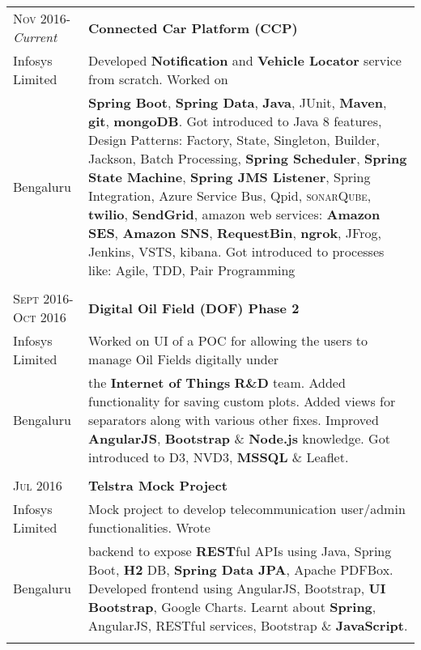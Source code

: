\documentclass[a4paper,10pt]{article} %
\begin{document}
\begin{tabular}{l|p{11cm}}
\textsc{Nov 2016-}\emph{Current} & \textbf{Connected Car Platform (CCP)} \\
Infosys Limited & \footnotesize{Developed \textbf{Notification} and \textbf{Vehicle Locator} service from scratch. Worked on}\\ 
Bengaluru & \footnotesize{\textbf{Spring Boot}, \textbf{Spring Data}, \textbf{Java}, JUnit, \textbf{Maven}, \textbf{git}, \textbf{mongoDB}. Got introduced to Java 8 features, Design Patterns: Factory, State, Singleton, Builder, Jackson, Batch Processing, \textbf{Spring Scheduler}, \textbf{Spring State Machine}, \textbf{Spring JMS Listener}, Spring Integration, Azure Service Bus, Qpid, \textsc{sonar}Q\textsc{ube}, \textbf{twilio}, \textbf{SendGrid}, amazon web services: \textbf{Amazon SES}, \textbf{Amazon SNS}, \textbf{RequestBin}, \textbf{ngrok}, JFrog, Jenkins, VSTS,  kibana. Got introduced to processes like: Agile, TDD, Pair Programming}\\
\multicolumn{2}{c}{} \\


\textsc{Sept 2016-Oct 2016} & \textbf{Digital Oil Field (DOF) Phase 2}\emph{}\\
Infosys Limited & \footnotesize{Worked on UI of a POC for allowing the users to manage Oil Fields digitally under}\\
Bengaluru & \footnotesize{the \textbf{Internet of Things} \textbf{R\&D} team. Added functionality for saving custom plots. Added views for separators along with various other fixes. Improved \textbf{AngularJS}, \textbf{Bootstrap} \& \textbf{Node.js} knowledge. Got introduced to D3, NVD3, \textbf{MSSQL} \& Leaflet.}\\
\multicolumn{2}{c}{} \\


\textsc{Jul 2016} & \textbf{Telstra Mock Project} \emph{}\\
Infosys Limited & \footnotesize{Mock project to develop telecommunication user/admin functionalities. Wrote}\\
Bengaluru & \footnotesize{backend to expose \textbf{REST}ful APIs using Java, Spring Boot, \textbf{H2} DB, \textbf{Spring Data JPA}, Apache PDFBox. Developed frontend using AngularJS, Bootstrap, \textbf{UI Bootstrap}, Google Charts. Learnt about \textbf{Spring}, AngularJS, RESTful services, Bootstrap \& \textbf{JavaScript}.}\\
\multicolumn{2}{c}{} \\


\end{tabular}
\end{document}
